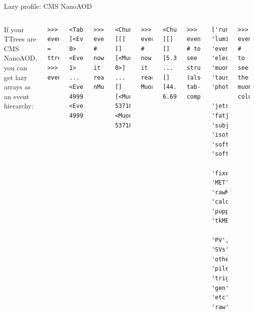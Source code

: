 \documentclass[aspectratio=169]{beamer}
\begin{document}
\begin{frame}[fragile]{Lazy profile: CMS NanoAOD}
\large
\vspace{0.5 cm}

\begin{columns}
If your TTrees are CMS NanoAOD, you can get lazy arrays as an event hierarchy:

\small
\begin{verbatim}
>>> events = ttree.lazyarrays(profile="cms.nanoaod")
>>> events
\end{verbatim}

\vspace{-0.6 cm}
\color{darkblue}\begin{verbatim}
<Table [<Event 0> <Event 1> ... <Event 499998> <Event 499999>]>
\end{verbatim}
\color{black}

\vspace{-0.6 cm}
\begin{verbatim}
>>> events.muons           # now it reads nMuon...
\end{verbatim}

\vspace{-0.6 cm}
\color{darkblue}\begin{verbatim}
<ChunkedArray [[] [] [<Muon 0>] ... [] [<Muon 537187> <Muon 537188>]]>
\end{verbatim}
\color{black}

\vspace{-0.6 cm}
\begin{verbatim}
>>> events.muons.pt        # now it reads Muon_pt...
\end{verbatim}

\vspace{-0.6 cm}
\color{darkblue}\begin{verbatim}
<ChunkedArray [[] [] [5.315762] ... [] [44.28051 6.6997213]]>
\end{verbatim}
\color{black}

\vspace{-0.6 cm}
\begin{verbatim}
>>> events.columns         # to see structure (also tab-complete)
\end{verbatim}

\vspace{-0.6 cm}
\color{darkblue}\begin{verbatim}
['run', 'lumi', 'event', 'electrons', 'muons', 'taus', 'photons',
 'jets', 'fatjets', 'subjets', 'isotracks', 'softjets', 'softactivity',
 'fixedGridRhoFastjet', 'MET', 'rawMET', 'caloMET', 'puppiMET', 'tkMET',
 'PV', 'SVs', 'otherPVs', 'pileup', 'trigobjs', 'gen', 'etc', 'raw']
\end{verbatim}
\color{black}

\vspace{-0.6 cm}
\begin{verbatim}
>>> events.muons.columns   # to see the muon columns...
\end{verbatim}
\end{columns}
\end{frame}
\end{document}

